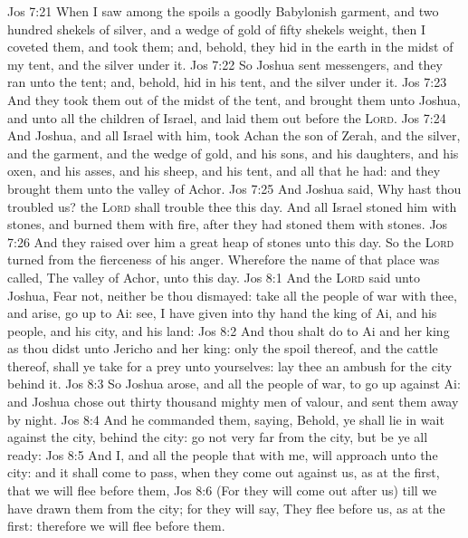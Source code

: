\vs Jos 7:21 When I saw among the spoils a goodly Babylonish garment, and two hundred shekels of silver, and a wedge of gold of fifty shekels weight, then I coveted them, and took them; and, behold, they  hid in the earth in the midst of my tent, and the silver under it.
\vs Jos 7:22 So Joshua sent messengers, and they ran unto the tent; and, behold,  hid in his tent, and the silver under it.
\vs Jos 7:23 And they took them out of the midst of the tent, and brought them unto Joshua, and unto all the children of Israel, and laid them out before the \textsc{Lord}.
\vs Jos 7:24 And Joshua, and all Israel with him, took Achan the son of Zerah, and the silver, and the garment, and the wedge of gold, and his sons, and his daughters, and his oxen, and his asses, and his sheep, and his tent, and all that he had: and they brought them unto the valley of Achor.
\vs Jos 7:25 And Joshua said, Why hast thou troubled us? the \textsc{Lord} shall trouble thee this day. And all Israel stoned him with stones, and burned them with fire, after they had stoned them with stones.
\vs Jos 7:26 And they raised over him a great heap of stones unto this day. So the \textsc{Lord} turned from the fierceness of his anger. Wherefore the name of that place was called, The valley of Achor, unto this day.
\vs Jos 8:1 And the \textsc{Lord} said unto Joshua, Fear not, neither be thou dismayed: take all the people of war with thee, and arise, go up to Ai: see, I have given into thy hand the king of Ai, and his people, and his city, and his land:
\vs Jos 8:2 And thou shalt do to Ai and her king as thou didst unto Jericho and her king: only the spoil thereof, and the cattle thereof, shall ye take for a prey unto yourselves: lay thee an ambush for the city behind it.
\vs Jos 8:3 So Joshua arose, and all the people of war, to go up against Ai: and Joshua chose out thirty thousand mighty men of valour, and sent them away by night.
\vs Jos 8:4 And he commanded them, saying, Behold, ye shall lie in wait against the city,  behind the city: go not very far from the city, but be ye all ready:
\vs Jos 8:5 And I, and all the people that  with me, will approach unto the city: and it shall come to pass, when they come out against us, as at the first, that we will flee before them,
\vs Jos 8:6 (For they will come out after us) till we have drawn them from the city; for they will say, They flee before us, as at the first: therefore we will flee before them.
